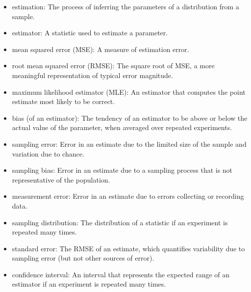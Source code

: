 \documentclass[12pt]{book}
\begin{document}
\begin{itemize}

\item estimation: The process of inferring the parameters of a distribution
from a sample.

\item estimator: A statistic used to estimate a parameter.

\item mean squared error (MSE): A measure of estimation error.

\item root mean squared error (RMSE): The square root of MSE,
a more meaningful representation of typical error magnitude.

\item maximum likelihood estimator (MLE): An estimator that computes the
point estimate most likely to be correct.

\item bias (of an estimator): The tendency of an estimator to be above or
  below the actual value of the parameter, when averaged over repeated
  experiments.  

\item sampling error: Error in an estimate due to the limited
  size of the sample and variation due to chance. 

\item sampling bias: Error in an estimate due to a sampling process
  that is not representative of the population. 

\item measurement error: Error in an estimate due to errors collecting
  or recording data. 

\item sampling distribution: The distribution of a statistic if an
  experiment is repeated many times.  

\item standard error: The RMSE of an estimate,
which quantifies variability due to sampling error (but not
other sources of error).

\item confidence interval: An interval that represents the expected
  range of an estimator if an experiment is repeated many times.
   

\end{itemize}
\end{document}
